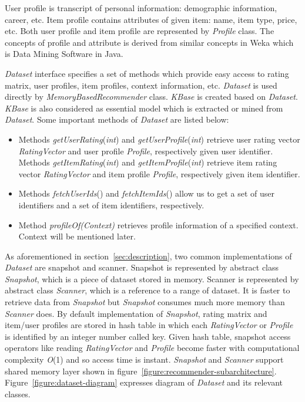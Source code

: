 \documentclass[a4paper,twoside]{article}
\begin{document}
User profile is transcript of personal information: demographic information, career, etc. Item profile contains attributes of given item: name, item type, price, etc. Both user profile and item profile are represented by \textit{Profile} class. The concepts of profile and attribute is derived from similar concepts in Weka \cite{waikato2008} which is Data Mining Software in Java.

\textit{Dataset} interface specifies a set of methods which provide easy access to rating matrix, user profiles, item profiles, context information, etc. \textit{Dataset} is used directly by \textit{MemoryBasedRecommender} class. \textit{KBase} is created based on \textit{Dataset}. \textit{KBase} is also considered as essential model which is extracted or mined from \textit{Dataset}. Some important methods of \textit{Dataset} are listed below:
\begin{itemize}
\item Methods \textit{getUserRating}(\textit{int}) and \textit{getUserProfile}(\textit{int}) retrieve user rating vector \textit{RatingVector} and user profile \textit{Profile}, respectively given user identifier. Methods \textit{getItemRating}(\textit{int}) and \textit{getItemProfile}(\textit{int}) retrieve item rating vector \textit{RatingVector} and item profile \textit{Profile}, respectively given item identifier.
\item Methods \textit{fetchUserIds}() and \textit{fetchItemIds}() allow us to get a set of user identifiers and a set of item identifiers, respectively.
\item Method \textit{profileOf(Context)} retrieves profile information of a specified context. Context will be mentioned later.
\end{itemize}
As aforementioned in section~\ref{sec:description}, two common implementations of \textit{Dataset} are snapshot and scanner. Snapshot is represented by abstract class \textit{Snapshot}, which is a piece of dataset stored in memory. Scanner is represented by abstract class \textit{Scanner}, which is a reference to a range of dataset. It is faster to retrieve data from \textit{Snapshot} but \textit{Snapshot} consumes much more memory than \textit{Scanner} does. By default implementation of \textit{Snapshot}, rating matrix and item/user profiles are stored in hash table in which each \textit{RatingVector} or \textit{Profile} is identified by an integer number called key. Given hash table, snapshot access operators like reading \textit{RatingVector} and \textit{Profile} become faster with computational complexity \textit{O}(1) and so access time is instant. \textit{Snapshot} and \textit{Scanner} support shared memory layer shown in figure~\ref{figure:recommender-subarchitecture}. Figure~\ref{figure:dataset-diagram} expresses diagram of \textit{Dataset} and its relevant classes.
\end{document}
